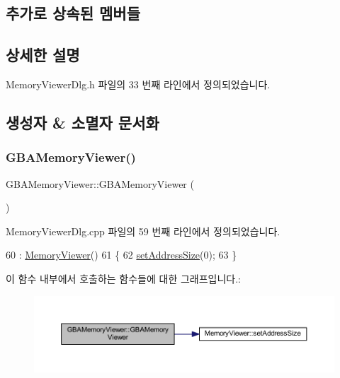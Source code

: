 \subsection*{추가로 상속된 멤버들}


\subsection{상세한 설명}


Memory\+Viewer\+Dlg.\+h 파일의 33 번째 라인에서 정의되었습니다.



\subsection{생성자 \& 소멸자 문서화}
\mbox{\label{class_g_b_a_memory_viewer_a00911f11f334d2357bdbb5eaa968f868}} 
\subsubsection{\texorpdfstring{G\+B\+A\+Memory\+Viewer()}{GBAMemoryViewer()}}
{\footnotesize\ttfamily G\+B\+A\+Memory\+Viewer\+::\+G\+B\+A\+Memory\+Viewer (\begin{DoxyParamCaption}{ }\end{DoxyParamCaption})}



Memory\+Viewer\+Dlg.\+cpp 파일의 59 번째 라인에서 정의되었습니다.


\begin{DoxyCode}
60   : \mbox{\hyperlink{class_memory_viewer_abb2fe8dcb2bfbf02b714dacc3d46cc55}{MemoryViewer}}()
61 \{
62   \mbox{\hyperlink{class_memory_viewer_a64938573e15f4d5b31eea26dc6788d0e}{setAddressSize}}(0);
63 \}
\end{DoxyCode}
이 함수 내부에서 호출하는 함수들에 대한 그래프입니다.\+:
\nopagebreak
\begin{figure}[H]
\begin{center}
\leavevmode
\includegraphics[width=350pt]{class_g_b_a_memory_viewer_a00911f11f334d2357bdbb5eaa968f868_cgraph}
\end{center}
\end{figure}


